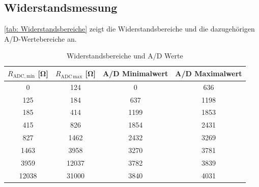 \subsection{Widerstandsmessung}
\autoref{tab: Widerstandsbereiche} zeigt die Widerstandsbereiche und die dazugehörigen A/D-Wertebereiche an.
\begin{table}[htb]
    \centering
    \caption{Widerstandsbereiche und A/D Werte}
    \label{tab: Widerstandsbereiche}
    \begin{tabular}{cccc}
        \toprule
        $R_{\text{ADC,}\,\text{min}}$ [\si{\ohm}]& $R_{\text{ADC}\, \text{max}}$  [\si{\ohm}] & A/D Minimalwert & A/D Maximalwert\\
        \midrule
        \num{0} & \num{124} & \num{0} & \num{636}\\
        \num{125} & \num{184} & \num{637} & \num{1198}\\
        \num{185} & \num{414} & \num{1199} & \num{1853}\\
		\num{415} & \num{826} & \num{1854} & \num{2431}\\
		\num{827} & \num{1462} & \num{2432} & \num{3269}\\
		\num{1463} & \num{3958} & \num{3270} & \num{3781}\\
		\num{3959} & \num{12037} & \num{3782} & \num{3839}\\
		\num{12038} & \num{31000} & \num{3840} & \num{4031}\\
        \bottomrule
    \end{tabular}
\end{table}


